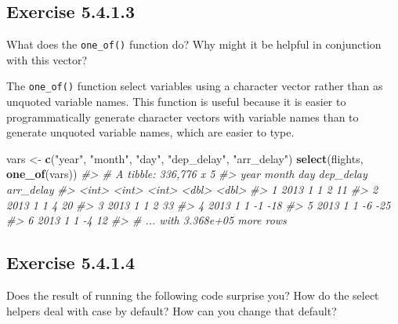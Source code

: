 \documentclass[]{book}
\newenvironment{Shaded}{\begin{snugshade}}{\end{snugshade}}
\newcommand{\CommentTok}[1]{\textcolor[rgb]{0.56,0.35,0.01}{\textit{#1}}}
\newcommand{\KeywordTok}[1]{\textcolor[rgb]{0.13,0.29,0.53}{\textbf{#1}}}
\newcommand{\NormalTok}[1]{#1}
\newcommand{\StringTok}[1]{\textcolor[rgb]{0.31,0.60,0.02}{#1}}
\theoremstyle{plain}
\theoremstyle{remark}
\begin{document}
\hypertarget{exercise-5.4.1.3}{%
\subsection*{\texorpdfstring{Exercise
{5.4.1.3}}{Exercise 5.4.1.3}}\label{exercise-5.4.1.3}}

What does the \texttt{one\_of()} function do? Why might it be helpful in
conjunction with this vector?

The \texttt{one\_of()} function select variables using a character
vector rather than as unquoted variable names. This function is useful
because it is easier to programmatically generate character vectors with
variable names than to generate unquoted variable names, which are
easier to type.

\begin{Shaded}
\begin{Highlighting}[]
\NormalTok{vars <-}\StringTok{ }\KeywordTok{c}\NormalTok{(}\StringTok{"year"}\NormalTok{, }\StringTok{"month"}\NormalTok{, }\StringTok{"day"}\NormalTok{, }\StringTok{"dep_delay"}\NormalTok{, }\StringTok{"arr_delay"}\NormalTok{)}
\KeywordTok{select}\NormalTok{(flights, }\KeywordTok{one_of}\NormalTok{(vars))}
\CommentTok{#> # A tibble: 336,776 x 5}
\CommentTok{#>    year month   day dep_delay arr_delay}
\CommentTok{#>   <int> <int> <int>     <dbl>     <dbl>}
\CommentTok{#> 1  2013     1     1         2        11}
\CommentTok{#> 2  2013     1     1         4        20}
\CommentTok{#> 3  2013     1     1         2        33}
\CommentTok{#> 4  2013     1     1        -1       -18}
\CommentTok{#> 5  2013     1     1        -6       -25}
\CommentTok{#> 6  2013     1     1        -4        12}
\CommentTok{#> # ... with 3.368e+05 more rows}
\end{Highlighting}
\end{Shaded}

\hypertarget{exercise-5.4.1.4}{%
\subsection*{\texorpdfstring{Exercise
{5.4.1.4}}{Exercise 5.4.1.4}}\label{exercise-5.4.1.4}}

Does the result of running the following code surprise you? How do the
select helpers deal with case by default? How can you change that
default?
\end{document}
